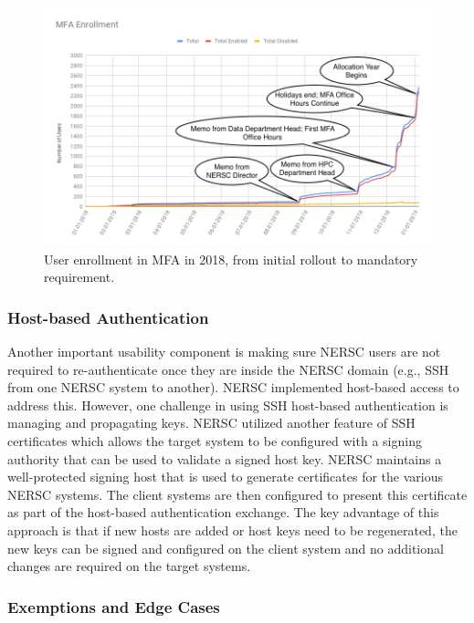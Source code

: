 \documentclass[sigconf,review]{acmart}
\begin{document}
\begin{figure}[ht!]
  \centering
  \includegraphics[width=\textwidth]{uptake.png}
  \caption{User enrollment in MFA in 2018, from initial rollout to mandatory requirement.}
  \label{uptake}
\end{figure}

\subsubsection{Host-based Authentication}
\label{host}

Another important usability component is making sure NERSC users are not
required to re-authenticate once they are inside the NERSC domain (e.g., SSH
from one NERSC system to another).  NERSC implemented host-based access to
address this.  However, one challenge in using SSH host-based authentication is
managing and propagating keys.  NERSC utilized another feature of SSH
certificates \cite{redhat2019} which allows the target system to be configured
with a signing authority that can be used to validate a signed host key.  NERSC
maintains a well-protected signing host that is used to generate certificates
for the various NERSC systems.  The client systems are then configured to
present this certificate as part of the host-based authentication exchange.  The
key advantage of this approach is that if new hosts are added or host keys need
to be regenerated, the new keys can be signed and configured on the client
system and no additional changes are required on the target systems.

\subsubsection{Exemptions and Edge Cases}
\label{edge}
\end{document}
